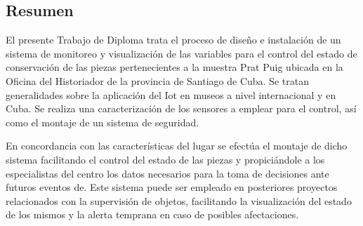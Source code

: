 \begin{center}
    \section*{Resumen}\label{sec: resumen}
\end{center}

El presente Trabajo de Diploma trata el proceso de diseño e instalación de un sistema de monitoreo y visualización de las variables para el control del estado de conservación de las piezas pertenecientes a la muestra Prat Puig ubicada en la Oficina del Historiador de la provincia de Santiago de Cuba. Se tratan generalidades sobre la aplicación del Iot en museos a nivel internacional y en Cuba. Se realiza una caracterización de los sensores a emplear para el control, así como el montaje de un sistema de seguridad.

En concordancia con las características del lugar se efectúa el montaje de dicho sistema facilitando el control del estado de las piezas y propiciándole a los especialistas del centro los datos necesarios para la toma de decisiones ante futuros eventos de. Este sistema puede ser empleado en posteriores proyectos relacionados con la supervisión de objetos, facilitando la visualización del estado de los mismos y la alerta temprana en caso de posibles afectaciones.